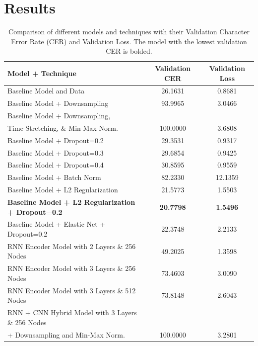 \documentclass{article}
\begin{document}
\section{Results}
\begin{table}[h]
  \caption{Comparison of different models and techniques with their Validation Character Error Rate (CER) and Validation Loss. The model with the lowest validation CER is bolded.}
  \label{tab:model_cer_loss}
  \centering
  \begin{tabular}{lcc}
    \toprule
    \textbf{Model + Technique} & \textbf{Validation CER} & \textbf{Validation Loss} \\
    \midrule
    Baseline Model and Data & 26.1631 & 0.8681 \\
    Baseline Model + Downsampling & 93.9965 & 3.0466 \\
    Baseline Model + Downsampling, \\ \hspace{0.5cm} Time Stretching, \& Min-Max Norm. & 100.0000 & 3.6808 \\
    Baseline Model + Dropout=0.2 & 29.3531 & 0.9317 \\
    Baseline Model + Dropout=0.3 & 29.6854 & 0.9425 \\
    Baseline Model + Dropout=0.4 & 30.8595 & 0.9559 \\
    Baseline Model + Batch Norm & 82.2330 & 12.1359 \\
    Baseline Model + L2 Regularization & 21.5773 & 1.5503 \\
    \textbf{Baseline Model + L2 Regularization + Dropout=0.2} & \textbf{20.7798} & \textbf{1.5496} \\
    Baseline Model + Elastic Net + Dropout=0.2 & 22.3748 & 2.2133 \\
    RNN Encoder Model with 2 Layers \& 256 Nodes & 49.2025 & 1.3598 \\
    RNN Encoder Model with 3 Layers \& 256 Nodes & 73.4603 & 3.0090 \\
    RNN Encoder Model with 3 Layers \& 512 Nodes & 73.8148 & 2.6043 \\
    RNN + CNN Hybrid Model with 3 Layers \& 256 Nodes \\ \hspace{0.5cm} + Downsampling and Min-Max Norm. & 100.0000 & 3.2801 \\
    
    \bottomrule
  \end{tabular}
\end{table}
\end{document}
